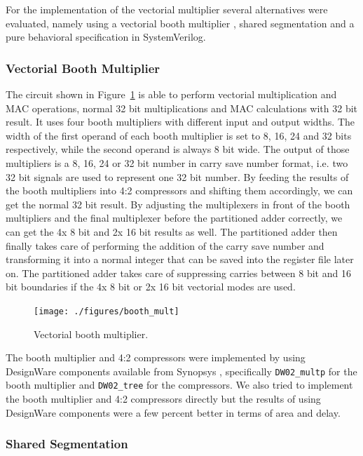 For the implementation of the vectorial multiplier several alternatives were
evaluated, namely using a vectorial booth multiplier \cite{BoothMul}, shared
segmentation \cite{SharedSeg} and a pure behavioral specification in
SystemVerilog.


\subsubsection{Vectorial Booth Multiplier}

The circuit shown in Figure~\ref{fig:vectorial_booth_mult} is able to perform
vectorial multiplication and \gls{MAC} operations, normal 32 bit multiplications
and \gls{MAC} calculations with 32 bit result. It uses four booth multipliers
with different input and output widths. The width of the first operand of each
booth multiplier is set to 8, 16, 24 and 32 bits respectively, while the
second operand is always 8 bit wide. The output of those multipliers is a
8, 16, 24 or 32 bit number in carry save number format, i.e. two 32 bit signals
are used to represent one 32 bit number. By feeding the results of the booth
multipliers into 4:2 compressors and shifting them accordingly, we can get the
normal 32 bit result. By adjusting the multiplexers in front of the booth multipliers
and the final multiplexer before the partitioned adder correctly, we can get the 4x 8
bit and 2x 16 bit results as well. The partitioned adder then finally takes care
of performing the addition of the carry save number and transforming it into a
normal integer that can be saved into the register file later on. The
partitioned adder takes care of suppressing carries between 8 bit and 16 bit
boundaries if the 4x 8 bit or 2x 16 bit vectorial modes are used.

\begin{figure}[H]
  \centering
  \texttt{[image: ./figures/booth\_mult]}
  \caption{Vectorial booth multiplier.}
  \label{fig:vectorial_booth_mult}
\end{figure}

The booth multiplier and 4:2 compressors were implemented by using DesignWare
components available from Synopsys \cite{DW}, specifically \texttt{DW02\_multp}
for the booth multiplier and \texttt{DW02\_tree} for the compressors. We also
tried to implement the booth multiplier and 4:2 compressors directly but the
results of using DesignWare components were a few percent better in terms of
area and delay.


\subsubsection{Shared Segmentation}


